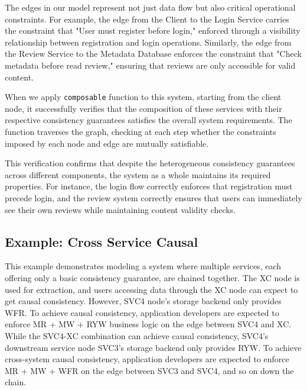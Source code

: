 The edges in our model represent not just data flow but also critical
operational constraints. For example, the edge from the Client to the
Login Service carries the constraint that "User must register before
login," enforced through a visibility relationship between
registration and login operations. Similarly, the edge from the
Review Service to the Metadata Database enforces the constraint that
"Check metadata before read review," ensuring that reviews are only
accessible for valid content.

When we apply \texttt{composable} function to this system,
starting from the client node, it successfully verifies that the
composition of these services with their respective consistency
guarantees satisfies the overall system requirements. The function
traverses the graph, checking at each step whether the constraints
imposed by each node and edge are mutually satisfiable.

This verification confirms that despite the heterogeneous consistency
guarantees across different components, the system as a whole
maintains its required properties. For instance, the login flow
correctly enforces that registration must precede login, and the
review system correctly ensures that users can immediately see their
own reviews while maintaining content validity checks.


\subsection{Example: Cross Service Causal}

This example demonstrates modeling a system where multiple services, each
offering only a basic consistency guarantee, are chained together.
The XC node is used for extraction, and users accessing data through
the XC node can expect to get causal consistency. However, SVC4
node's storage backend only provides WFR. To achieve causal
consistency, application developers are expected to enforce MR + MW +
RYW business logic on the edge between SVC4 and XC. While the SVC4-XC
combination can achieve causal consistency, SVC4's downstream service
node SVC3's storage backend only provides RYW. To achieve
cross-system causal consistency, application developers are expected
to enforce MR + MW + WFR on the edge between SVC3 and SVC4, and so on
down the chain.

